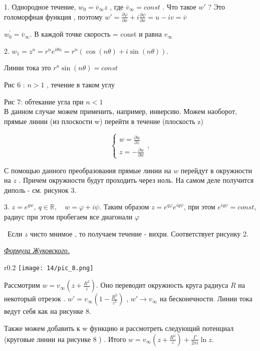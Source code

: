 1. Однородное течение, $w_0 = \overline{v}_{\infty} z$  , где $ \overline{v}_{\infty}  = const$ . Что такое $w'$ ? Это голоморфная функция , поэтому $w' = \frac{\partial \varphi}{\partial x} + i \frac{\partial \psi}{\partial x}  = u - iv = \overline{v}$


$w_0^{'} = \overline{v}_{\infty}$. В каждой точке скорость = const и равна $v_{\infty}$

2. $w_1 = z^n = r^n e^{i \theta n} = r^n(\cos(n \theta) + i \sin (n \theta) )$.  

Линии тока это $r^n \sin(n \theta) = const $ 

Рис 6 : $n > 1$ , течение в таком углу 

Рис 7: обтекание угла при $n < 1$ \\

В данном случае можем применить, например, инверсию. Можем наоборот, прямые линии (из плоскости w) перейти в течение (плоскость z)

$$ \begin{cases}
	w  = \frac{\partial u}{\partial z}\\
	z = -\frac{\partial u}{\partial w} 
\end{cases},$$

С помощью данного преобразования прямые линии на $w$ перейдут в окружности на $z$ . Причем окружности будут проходить через ноль. На самом деле получится диполь - см. рисунок 3.  

3. $z = e^{q w}, \ q \in \mathbb{R} , \quad w = \varphi + i \psi$. Таким образом $z = e^{q \varphi} e^{i q \psi}$, при этом $e^{i q \psi} = const$, радиус при этом пробегаем все диагонали $\varphi$

 Если $z$ чисто мнимое , то получаем течение - вихри. Соответствует рисунку 2.

\begin{center}
	\textit{\underline{Формула Жуковского.}}
\end{center}

\begin{wrapfigure}{r}{0.2\textwidth}
	\texttt{[image: 14/pic\_8.png]}
	\caption{\label{ris:image14.8}}
\end{wrapfigure}

Рассмотрим $w=v_{\infty}(z + \frac{R^2}{z})$. Оно переводит окружность круга радиуса $R$ на некоторый отрезок . $w' = v_{\infty} ( 1 -  \frac{R^2}{z^2})$ , $w' \rightarrow v_{\infty} $ на бесконечности. Линии тока ведут себя как на рисунке 8. 

Также можем добавить к w функцию и рассмотреть следующий потенциал (круговые линии на рисунке 8 ) . Итого $w = v_{\infty}(z + \frac{R^2}{z}) + \frac{\Gamma}{2 \pi i} \ln z$. 

